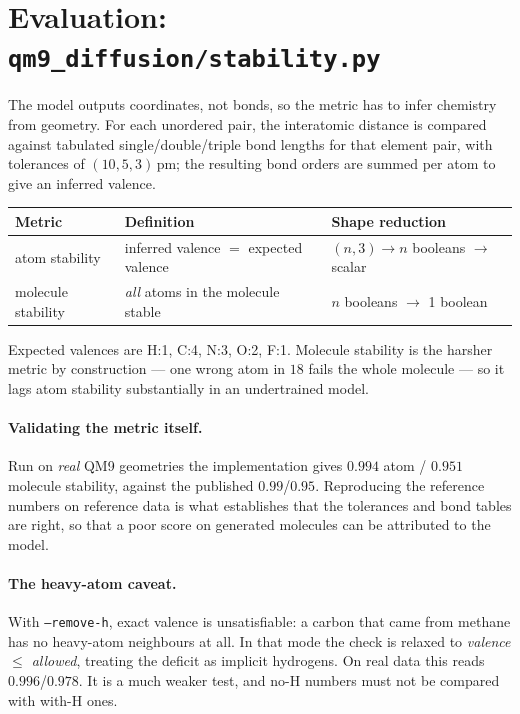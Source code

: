 \documentclass[11pt,a4paper]{article}
\newcommand{\code}[1]{\texttt{#1}}
\newcommand{\file}[1]{\textcolor{BlueLink}{\texttt{#1}}}
\begin{document}
\section{Evaluation: \file{qm9\_diffusion/stability.py}}
\label{sec:eval}

The model outputs coordinates, not bonds, so the metric has to infer chemistry
from geometry. For each unordered pair, the interatomic distance is compared
against tabulated single/double/triple bond lengths for that element pair, with
tolerances of $(10,5,3)$\,pm; the resulting bond orders are summed per atom to
give an inferred valence.

\begin{center}
\begin{tabular}{@{}lll@{}}
\toprule
\textbf{Metric} & \textbf{Definition} & \textbf{Shape reduction} \\
\midrule
atom stability     & inferred valence $=$ expected valence & $(n,3)\to n$ booleans $\to$ scalar \\
molecule stability & \emph{all} atoms in the molecule stable & $n$ booleans $\to$ 1 boolean \\
\bottomrule
\end{tabular}
\end{center}

\noindent
Expected valences are H:1, C:4, N:3, O:2, F:1. Molecule stability is the harsher
metric by construction --- one wrong atom in $18$ fails the whole molecule --- so it
lags atom stability substantially in an undertrained model.

\paragraph{Validating the metric itself.} Run on \emph{real} QM9 geometries the
implementation gives $0.994$ atom / $0.951$ molecule stability, against the
published $0.99$/$0.95$. Reproducing the reference numbers on reference data is
what establishes that the tolerances and bond tables are right, so that a poor
score on generated molecules can be attributed to the model.

\paragraph{The heavy-atom caveat.} With \code{--remove-h}, exact valence is
unsatisfiable: a carbon that came from methane has no heavy-atom neighbours at
all. In that mode the check is relaxed to \emph{valence $\le$ allowed}, treating
the deficit as implicit hydrogens. On real data this reads $0.996$/$0.978$. It
is a much weaker test, and no-H numbers must not be compared with with-H ones.
\end{document}
